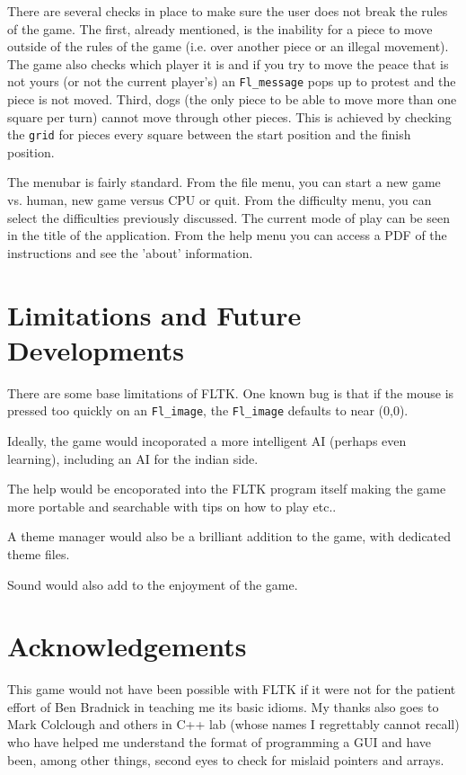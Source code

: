 \documentclass{UoBnote}
\begin{document}
There are several checks in place to make sure the user does not break the rules of the game. The first, already mentioned, is the inability for a piece to move outside of the rules of the game (i.e. over another piece or an illegal movement). The game also checks which player it is and if you try to move the peace that is not yours (or not the current player's) an \verb=Fl_message= pops up to protest and the piece is not moved. Third, dogs (the only piece to be able to move more than one square per turn) cannot move through other pieces. This is achieved by checking the \verb=grid= for pieces every square between the start position and the finish position.

The menubar is fairly standard. From the file menu, you can start a new game vs. human, new game versus CPU or quit. From the difficulty menu, you can select the difficulties previously discussed. The current mode of play can be seen in the title of the application. From the help menu you can access a PDF of the instructions and see the 'about' information.

\section{Limitations and Future Developments}
There are some base limitations of FLTK. One known bug is that if the mouse is pressed too quickly on an \verb=Fl_image=, the \verb=Fl_image= defaults to near (0,0).

Ideally, the game would incoporated a more intelligent AI (perhaps even learning), including an AI for the indian side.

The help would be encoporated into the FLTK program itself making the game more portable and searchable with tips on how to play etc..

A theme manager would also be a brilliant addition to the game, with dedicated theme files.

Sound would also add to the enjoyment of the game.
\section{Acknowledgements}
This game would not have been possible with FLTK if it were not for the patient effort of Ben Bradnick in teaching me its basic idioms. My thanks also goes to Mark Colclough and others in C++ lab (whose names I regrettably cannot recall) who have helped me understand the format of programming a GUI and have been, among other things, second eyes to check for mislaid pointers and arrays. 
\end{document}

